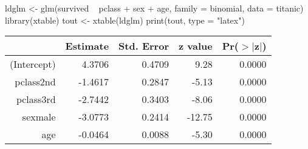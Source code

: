 \begin{Schunk}
\begin{Sinput}
 ldglm <- glm(survived ~ pclass + sex + age, family = binomial, data = titanic)
 library(xtable)
 tout <- xtable(ldglm)
 print(tout, type = "latex")
\end{Sinput}
% latex table generated in R 3.0.1 by xtable 1.7-1 package
% Mon Jun 10 08:30:38 2013
\begin{table}[ht]
\centering
\begin{tabular}{rrrrr}
  \hline
 & Estimate & Std. Error & z value & Pr($>$$|$z$|$) \\ 
  \hline
(Intercept) & 4.3706 & 0.4709 & 9.28 & 0.0000 \\ 
  pclass2nd & -1.4617 & 0.2847 & -5.13 & 0.0000 \\ 
  pclass3rd & -2.7442 & 0.3403 & -8.06 & 0.0000 \\ 
  sexmale & -3.0773 & 0.2414 & -12.75 & 0.0000 \\ 
  age & -0.0464 & 0.0088 & -5.30 & 0.0000 \\ 
   \hline
\end{tabular}
\end{table}\end{Schunk}
